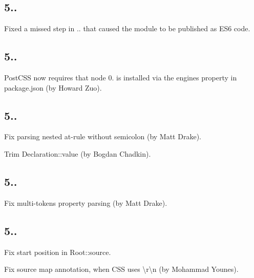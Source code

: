\subsection*{5..}


\begin{DoxyItemize}
\item Fixed a missed step in {..} that caused the module to be published as E\+S6 code.
\end{DoxyItemize}

\subsection*{5..}


\begin{DoxyItemize}
\item Post\+C\+SS now requires that node 0. is installed via the engines property in package.\+json (by Howard Zuo).
\end{DoxyItemize}

\subsection*{5..}


\begin{DoxyItemize}
\item Fix parsing nested at-\/rule without semicolon (by Matt Drake).
\item Trim {\ttfamily Declaration\+::value} (by Bogdan Chadkin).
\end{DoxyItemize}

\subsection*{5..}


\begin{DoxyItemize}
\item Fix multi-\/tokens property parsing (by Matt Drake).
\end{DoxyItemize}

\subsection*{5..}


\begin{DoxyItemize}
\item Fix start position in {\ttfamily Root\+::source}.
\item Fix source map annotation, when C\+SS uses {\ttfamily \textbackslash{}r\textbackslash{}n} (by Mohammad Younes).
\end{DoxyItemize}

